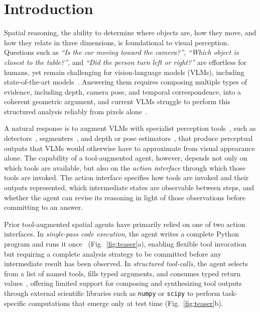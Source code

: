 \section{Introduction}
\label{sec:intro}


Spatial reasoning, the ability to determine where objects are, how they move, and how they relate in three dimensions, is foundational to visual perception.
Questions such as \emph{``Is the car moving toward the camera?''}, \emph{``Which object is closest to the table?''}, and \emph{``Did the person turn left or right?''} are effortless for humans, yet remain challenging for vision-language models (VLMs), including state-of-the-art models~\citep{yang2024think,chen2025eagle2.5,qwen3.5,gemma4}.
Answering them requires composing multiple types of evidence, including depth, camera pose, and temporal correspondence, into a coherent geometric argument, and current VLMs struggle to perform this structured analysis reliably from pixels alone~\citep{chen2024spatialvlm,cheng2024spatialrgpt,cho20264dpqa}.

A natural response is to augment VLMs with specialist perception tools~\citep{Gupta2022VisProg,surismenon2023vipergpt,shen2023hugginggpt,lu2026octotools,chen2025spacetools,han2025tiger}, such as detectors~\citep{carion2020end}, segmenters~\citep{ravi2024sam,carion2025sam}, and depth or pose estimators~\citep{wang2025pi}, that produce perceptual outputs that VLMs would otherwise have to approximate from visual appearance alone.
The capability of a tool-augmented agent, however, depends not only on which tools are available, but also on the \emph{action interface} through which those tools are invoked.
The action interface specifies how tools are invoked and their outputs represented, which intermediate states are observable between steps, and whether the agent can revise its reasoning in light of those observations before committing to an answer.

Prior tool-augmented spatial agents have primarily relied on one of two action interfaces.
In \emph{single-pass code execution}, the agent writes a complete Python program and runs it once~\citep{luo2026pyspatial,marsili2025visual} (Fig.~\ref{fig:teaser}a), enabling flexible tool invocation but requiring a complete analysis strategy to be committed before any intermediate result has been observed.
In \emph{structured tool-calls}, the agent selects from a list of named tools, fills typed arguments, and consumes typed return values~\citep{chen2025geometrically,chen2025spacetools,ropero2026riemind}, offering limited support for composing and synthesizing tool outputs through external scientific libraries such as \texttt{numpy} or \texttt{scipy} to perform task-specific computations that emerge only at test time (Fig.~\ref{fig:teaser}b).

